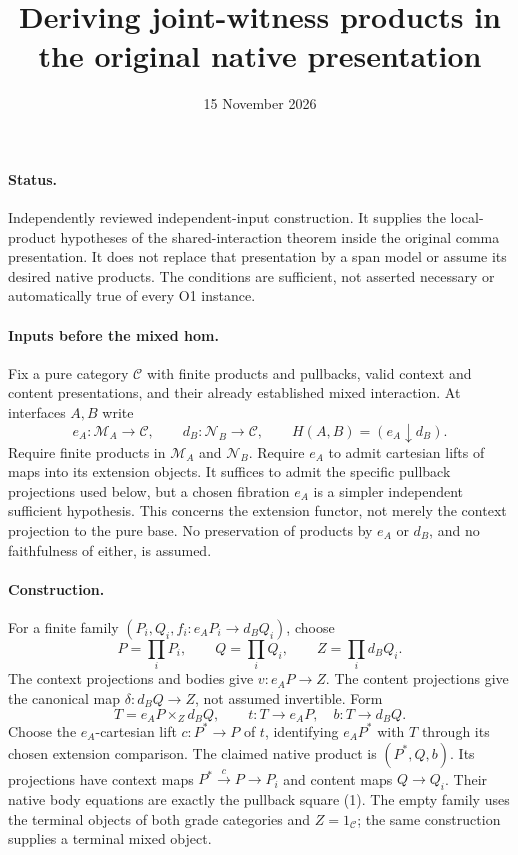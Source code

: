 \documentclass{article}
\title{Deriving joint-witness products in the original native presentation}
\date{15 November 2026}
\begin{document}
\maketitle
\paragraph{Status.} Independently reviewed independent-input construction. It supplies the local-product hypotheses of the shared-interaction theorem inside the original comma presentation. It does not replace that presentation by a span model or assume its desired native products. The conditions are sufficient, not asserted necessary or automatically true of every O1 instance.

\paragraph{Inputs before the mixed hom.} Fix a pure category $\mathcal C$ with finite products and pullbacks, valid context and content presentations, and their already established mixed interaction. At interfaces $A,B$ write
\[
 e_A:\mathcal M_A\to\mathcal C,\qquad d_B:\mathcal N_B\to\mathcal C,
 \qquad H(A,B)=(e_A\downarrow d_B).
\]
Require finite products in $\mathcal M_A$ and $\mathcal N_B$. Require $e_A$ to admit cartesian lifts of maps into its extension objects. It suffices to admit the specific pullback projections used below, but a chosen fibration $e_A$ is a simpler independent sufficient hypothesis. This concerns the extension functor, not merely the context projection to the pure base. No preservation of products by $e_A$ or $d_B$, and no faithfulness of either, is assumed.

\paragraph{Construction.} For a finite family $(P_i,Q_i,f_i:e_AP_i\to d_BQ_i)$, choose
\[
 P=\prod_iP_i,\qquad Q=\prod_iQ_i,
 \qquad Z=\prod_i d_BQ_i.
\]
The context projections and bodies give $v:e_AP\to Z$. The content projections give the canonical map $\delta:d_BQ\to Z$, not assumed invertible. Form
\[
 T=e_AP\times_Zd_BQ,
 \qquad t:T\to e_AP,\quad b:T\to d_BQ.
\tag{1}
\]
Choose the $e_A$-cartesian lift $c:P^*\to P$ of $t$, identifying $e_AP^*$ with $T$ through its chosen extension comparison. The claimed native product is $(P^*,Q,b)$. Its projections have context maps $P^*\xrightarrow cP\to P_i$ and content maps $Q\to Q_i$. Their native body equations are exactly the pullback square (1). The empty family uses the terminal objects of both grade categories and $Z=1_{\mathcal C}$; the same construction supplies a terminal mixed object.
\end{document}
